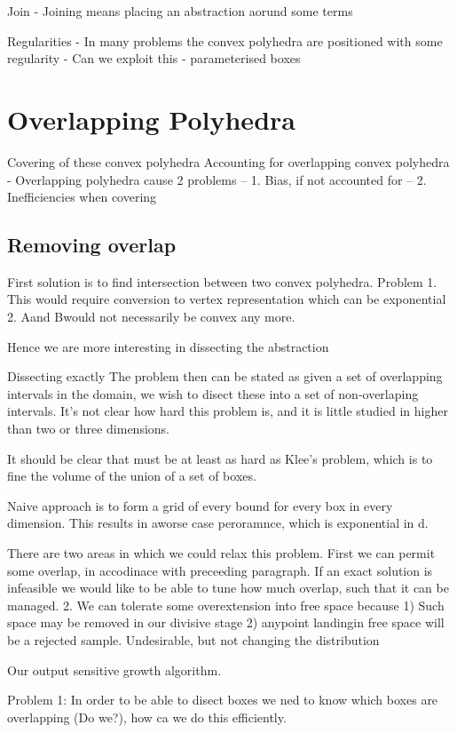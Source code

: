 Join
- Joining means placing an abstraction aorund some terms

Regularities
- In many problems the convex polyhedra are positioned with some regularity
- Can we exploit this
- parameterised boxes

\section{Overlapping Polyhedra}
Covering of these convex polyhedra
Accounting for overlapping convex polyhedra
- Overlapping polyhedra cause 2 problems
-- 1. Bias, if not accounted for
-- 2. Inefficiencies when covering

\subsection{Removing overlap}
First solution is to find intersection between two convex polyhedra.
Problem 1. This would require conversion to vertex representation which can be exponential
2. A\B and B\A would not necessarily be convex any more.

Hence we are more interesting in dissecting the abstraction

Dissecting exactly
The problem then can be stated as given a set of overlapping intervals in the domain, we wish to disect these into a set of non-overlaping intervals.
It's not clear how hard this problem is, and it is little studied in higher than two or three dimensions.

It should be clear that must be at least as hard as Klee's problem, which is to fine the volume of the union of a set of boxes.

Naive approach is to form a grid of every bound for every box in every dimension.  This results in aworse case peroramnce, which is exponential in d.

There are two areas in which we could relax this problem.  First we can permit some overlap, in accodinace with preceeding paragraph.  If an exact solution is infeasible we would like to be able to tune how much overlap, such that it can be managed.  2. We can tolerate some overextension into free space because 1) Such space may be removed in our divisive stage 2) anypoint landingin free space will be a rejected sample.  Undesirable, but not changing the distribution

Our output sensitive growth algorithm.

Problem 1: In order to be able to disect boxes we ned to know which boxes are overlapping (Do we?), how ca we do this efficiently.

